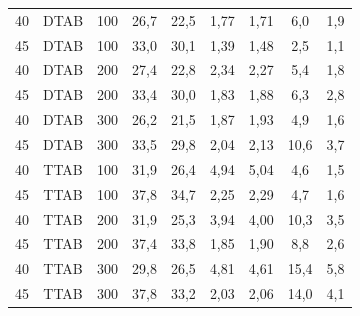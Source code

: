 \begin{table}[h]
{\begin{tabular}{ccccccccc}
    			\midrule
    			40     & DTAB  & 100        & 26,7     & 22,5      & 1,77     & 1,71      & 6,0      & 1,9       \\
    			45     & DTAB  & 100        & 33,0     & 30,1      & 1,39     & 1,48      & 2,5      & 1,1       \\
    			40     & DTAB  & 200        & 27,4     & 22,8      & 2,34     & 2,27      & 5,4      & 1,8       \\
    			45     & DTAB  & 200        & 33,4     & 30,0      & 1,83     & 1,88      & 6,3      & 2,8       \\
    			40     & DTAB  & 300        & 26,2     & 21,5      & 1,87     & 1,93      & 4,9      & 1,6       \\
    			45     & DTAB  & 300        & 33,5     & 29,8      & 2,04     & 2,13      & 10,6     & 3,7       \\
    			\midrule
    			40     & TTAB  & 100        & 31,9     & 26,4      & 4,94     & 5,04      & 4,6      & 1,5       \\
    			45     & TTAB  & 100        & 37,8     & 34,7      & 2,25     & 2,29      & 4,7      & 1,6       \\
    			40     & TTAB  & 200        & 31,9     & 25,3      & 3,94     & 4,00      & 10,3     & 3,5       \\
    			45     & TTAB  & 200        & 37,4     & 33,8      & 1,85     & 1,90      & 8,8      & 2,6       \\
    			40     & TTAB  & 300        & 29,8     & 26,5      & 4,81     & 4,61      & 15,4     & 5,8       \\
    			45     & TTAB  & 300        & 37,8     & 33,2      & 2,03     & 2,06      & 14,0     & 4,1       \\
                \bottomrule
                \end{tabular}}%
            {}
        \end{table}
        
